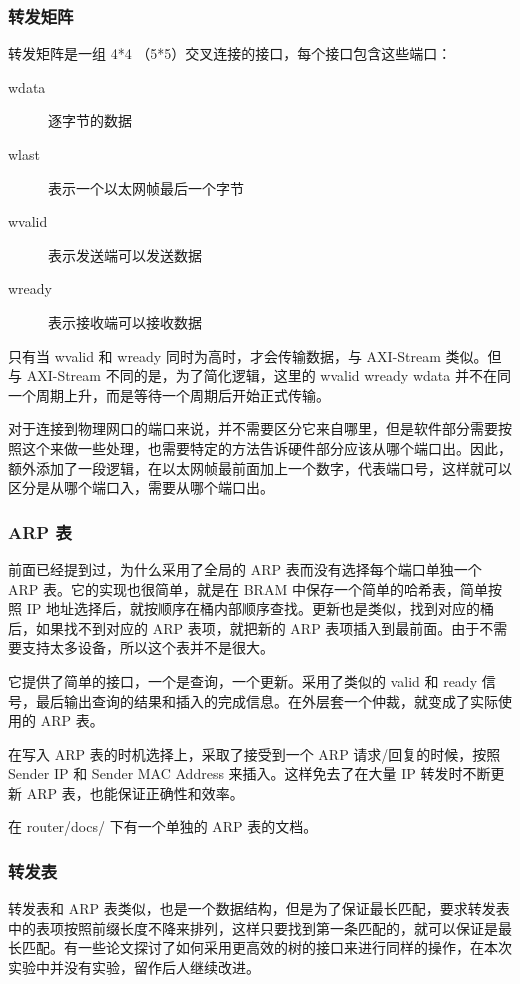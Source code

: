 \documentclass{ctexart}
\begin{document}
\subsubsection{转发矩阵}
  转发矩阵是一组 4*4 （5*5）交叉连接的接口，每个接口包含这些端口：

  \begin{description}
    \item[wdata] 逐字节的数据
    \item[wlast] 表示一个以太网帧最后一个字节
    \item[wvalid] 表示发送端可以发送数据
    \item[wready] 表示接收端可以接收数据 
  \end{description}

  只有当 wvalid 和 wready 同时为高时，才会传输数据，与 AXI-Stream 类似。但与 AXI-Stream 不同的是，为了简化逻辑，这里的 wvalid wready wdata 并不在同一个周期上升，而是等待一个周期后开始正式传输。

  对于连接到物理网口的端口来说，并不需要区分它来自哪里，但是软件部分需要按照这个来做一些处理，也需要特定的方法告诉硬件部分应该从哪个端口出。因此，额外添加了一段逻辑，在以太网帧最前面加上一个数字，代表端口号，这样就可以区分是从哪个端口入，需要从哪个端口出。

\subsubsection{ARP 表}
  前面已经提到过，为什么采用了全局的 ARP 表而没有选择每个端口单独一个 ARP 表。它的实现也很简单，就是在 BRAM 中保存一个简单的哈希表，简单按照 IP 地址选择后，就按顺序在桶内部顺序查找。更新也是类似，找到对应的桶后，如果找不到对应的 ARP 表项，就把新的 ARP 表项插入到最前面。由于不需要支持太多设备，所以这个表并不是很大。

  它提供了简单的接口，一个是查询，一个更新。采用了类似的 valid 和 ready 信号，最后输出查询的结果和插入的完成信息。在外层套一个仲裁，就变成了实际使用的 ARP 表。

  在写入 ARP 表的时机选择上，采取了接受到一个 ARP 请求/回复的时候，按照 Sender IP 和 Sender MAC Address 来插入。这样免去了在大量 IP 转发时不断更新 ARP 表，也能保证正确性和效率。

  在 router/docs/ 下有一个单独的 ARP 表的文档。

\subsubsection{转发表}
  转发表和 ARP 表类似，也是一个数据结构，但是为了保证最长匹配，要求转发表中的表项按照前缀长度不降来排列，这样只要找到第一条匹配的，就可以保证是最长匹配。有一些论文探讨了如何采用更高效的树的接口来进行同样的操作，在本次实验中并没有实验，留作后人继续改进。
\end{document}
